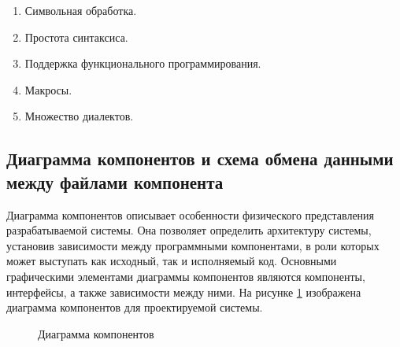 \begin{enumerate} 
\item Символьная обработка. 
\item Простота синтаксиса.
\item Поддержка функционального программирования.
\item Макросы.
\item Множество диалектов.
\end{enumerate}

\subsection{Диаграмма компонентов и схема обмена данными между файлами компонента}

Диаграмма компонентов описывает особенности физического представления разрабатываемой системы. Она позволяет определить архитектуру системы, установив зависимости между программными компонентами, в роли которых может выступать как исходный, так и исполняемый код. Основными графическими элементами диаграммы компонентов являются компоненты, интерфейсы, а также зависимости между ними. На рисунке \ref{comp:image} изображена диаграмма компонентов для проектируемой системы. 

\begin{figure}[ht]
\caption{Диаграмма компонентов}
\label{comp:image}
\end{figure}
